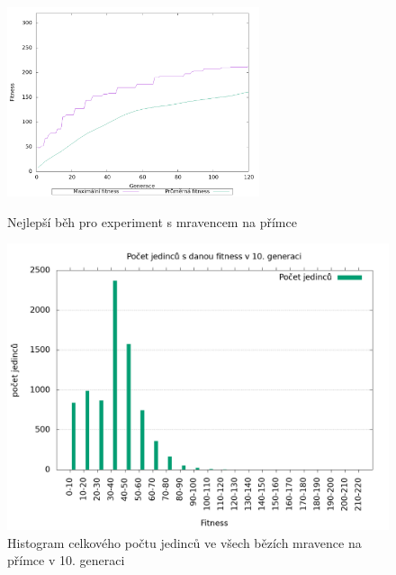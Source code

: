 \begin{figure}[h]
    \begin{minipage}[c]{0.48\linewidth}
    {\includegraphics[width=20em]{obrazky/mravenec_primka_fitness_prubeh.png}}
        \caption{
        Nejlepší běh pro experiment s mravencem na přímce
        }
    \end{minipage}
    \hfill
    \begin{minipage}[c]{0.48\linewidth}
        \includegraphics[width=\linewidth]{obrazky/mravenec_primka_fitnessHistogram10.png}
        \caption{Histogram celkového počtu jedinců ve všech bězích mravence na přímce v 10. generaci}
    \end{minipage}
\end{figure}

